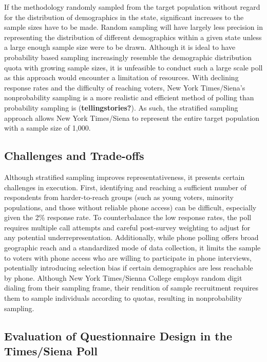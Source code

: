\documentclass[
  letterpaper,
  DIV=11,
  numbers=noendperiod]{scrartcl}
\begin{document}
If the methodology randomly sampled from the target population without
regard for the distribution of demographics in the state, significant
increases to the sample sizes have to be made. Random sampling will have
largely less precision in representing the distribution of different
demographics within a given state unless a large enough sample size were
to be drawn. Although it is ideal to have probability based sampling
increasingly resemble the demographic distribution quota with growing
sample sizes, it is unfeasible to conduct such a large scale poll as
this approach would encounter a limitation of resources. With declining
response rates and the difficulty of reaching voters, New York
Times/Siena's nonprobability sampling is a more realistic and efficient
method of polling than probability sampling is
(\textbf{tellingstories?}). As such, the stratified sampling approach
allows New York Times/Siena to represent the entire target population
with a sample size of 1,000.

\hypertarget{challenges-and-trade-offs}{%
\subsection{Challenges and Trade-offs}\label{challenges-and-trade-offs}}

Although stratified sampling improves representativeness, it presents
certain challenges in execution. First, identifying and reaching a
sufficient number of respondents from harder-to-reach groups (such as
young voters, minority populations, and those without reliable phone
access) can be difficult, especially given the 2\% response rate. To
counterbalance the low response rates, the poll requires multiple call
attempts and careful post-survey weighting to adjust for any potential
underrepresentation. Additionally, while phone polling offers broad
geographic reach and a standardized mode of data collection, it limits
the sample to voters with phone access who are willing to participate in
phone interviews, potentially introducing selection bias if certain
demographics are less reachable by phone. Although New York Times/Sienna
College employs random digit dialing from their sampling frame, their
rendition of sample recruitment requires them to sample individuals
according to quotas, resulting in nonprobability sampling.

\hypertarget{evaluation-of-questionnaire-design-in-the-timessiena-poll}{%
\subsection{Evaluation of Questionnaire Design in the Times/Siena
Poll}\label{evaluation-of-questionnaire-design-in-the-timessiena-poll}}
\end{document}
